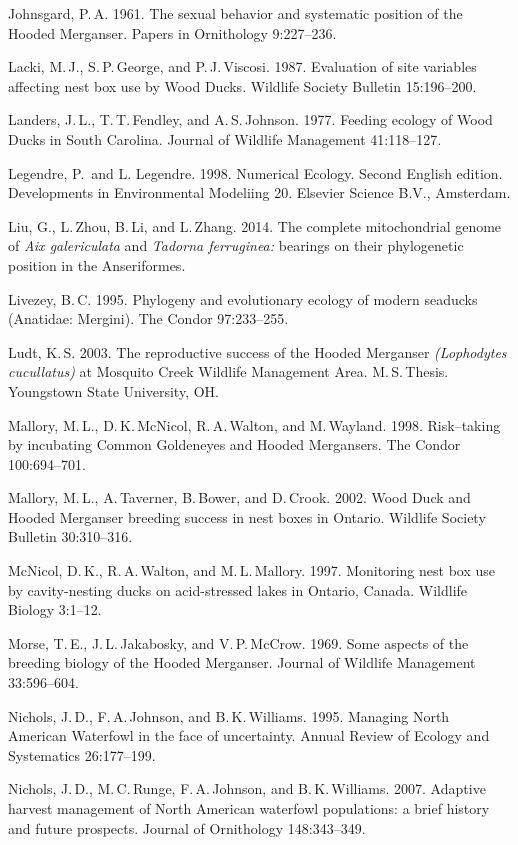 \begin{hangparas}{2em}{1}
	Johnsgard, P.\,A. 1961. The sexual behavior and systematic position of the Hooded Merganser. Papers in Ornithology 9:227–236.
	
	Lacki, M.\,J., S.\,P.\,George, and P.\,J.\,Viscosi. 1987. Evaluation of site variables affecting nest box use by Wood Ducks. Wildlife Society Bulletin 15:196–200. 
	
	Landers, J.\,L., T.\,T.\,Fendley, and A.\,S.\,Johnson. 1977. Feeding ecology of Wood Ducks in South Carolina. Journal of Wildlife Management 41:118–127. 
	
	Legendre, P.\, and L. Legendre. 1998. Numerical Ecology. Second English edition. Developments in Environmental Modeliing 20. Elsevier Science B.V., Amsterdam.
	
	Liu, G., L.\,Zhou, B.\,Li, and L.\,Zhang. 2014. The complete mitochondrial genome of \textit{Aix galericulata} and \textit{Tadorna ferruginea:} bearings on their phylogenetic position in the Anseriformes.
	
	Livezey, B.\,C. 1995. Phylogeny and evolutionary ecology of modern seaducks (Anatidae: Mergini). The Condor 97:233–255. 
	
	Ludt, K.\,S. 2003. The reproductive success of the Hooded Merganser \textit{(Lophodytes cucullatus)} at Mosquito Creek Wildlife Management Area. M.\,S.\,Thesis. Youngstown State University, OH.
	
	Mallory, M.\,L., D.\,K.\,McNicol, R.\,A.\,Walton, and M.\,Wayland. 1998. Risk–taking by incubating Common Goldeneyes and Hooded Mergansers. The Condor 100:694–701. 
	
	Mallory, M.\,L., A.\,Taverner, B.\,Bower, and D.\,Crook. 2002. Wood Duck and Hooded Merganser breeding success in nest boxes in Ontario. Wildlife Society Bulletin 30:310–316. 
	
	McNicol, D.\,K., R.\,A.\,Walton, and M.\,L.\,Mallory. 1997. Monitoring nest box use by cavity-nesting ducks on acid-stressed lakes in Ontario, Canada. Wildlife Biology 3:1–12. 
	
	Morse, T.\,E., J.\,L.\,Jakabosky, and V.\,P.\,McCrow. 1969. Some aspects of the breeding biology of the Hooded Merganser. Journal of Wildlife Management 33:596–604. 
	
	Nichols, J.\,D., F.\,A.\,Johnson, and B.\,K.\,Williams. 1995. Managing North American Waterfowl in the face of uncertainty. Annual Review of Ecology and Systematics 26:177–199. 
	
	Nichols, J.\,D., M.\,C.\,Runge, F.\,A.\,Johnson, and B.\,K.\,Williams. 2007. Adaptive harvest management of North American waterfowl populations: a brief history and future prospects. Journal of Ornithology 148:343–349. 
	

\end{hangparas}
